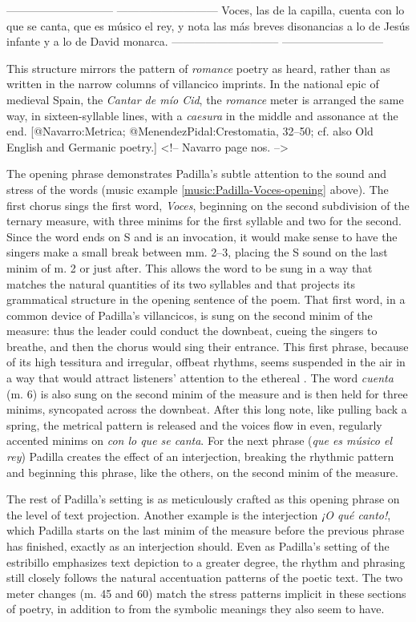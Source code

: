 -----------------------------   ---------------------------
Voces, las de la capilla,       cuenta con lo que se canta,
que es músico el rey, y nota    las más breves disonancias
a lo de Jesús infante           y a lo de David monarca.
-----------------------------   ---------------------------

\noindent
This structure mirrors the pattern of \emph{romance} poetry as heard, rather than as
written in the narrow columns of villancico imprints.
In the national epic of medieval Spain, the \emph{Cantar de mío Cid}, the \emph{romance}
meter is arranged the same way, in sixteen-syllable lines, with a \emph{caesura} in
the middle and assonance at the end.
[@Navarro:Metrica; @MenendezPidal:Crestomatia, 32--50; cf. also Old English
and Germanic poetry.]
<!-- Navarro page nos. -->

The opening phrase demonstrates Padilla's subtle attention to the sound and
stress of the words (music example \ref{music:Padilla-Voces-opening} above).
The first chorus sings the first word, \emph{Voces}, beginning on the second
subdivision of the ternary measure, with three minims for the first syllable and
two for the second.
Since the word ends on S and is an invocation, it would make sense to have the
singers make a small break between mm. 2--3, placing the S sound on the last
minim of m. 2 or just after.
This allows the word to be sung in a way that matches the natural quantities of
its two syllables and that projects its grammatical structure in the opening
sentence of the poem.
That first word, in a common device of Padilla's villancicos, is sung on the
second minim of the measure: thus the leader could conduct the downbeat, cueing
the singers to breathe, and then the chorus would sing their entrance. 
This first phrase, because of its high tessitura and irregular, offbeat rhythms,
seems suspended in the air in a way that would attract listeners' attention to
the ethereal . 
The word \emph{cuenta} (m. 6) is also sung on the second minim of the measure and is
then held for three minims, syncopated across the downbeat.
After this long note, like pulling back a spring, the metrical pattern is
released and the voices flow in even, regularly accented minims on \emph{con lo que
se canta}.
For the next phrase (\emph{que es músico el rey}) Padilla creates the effect of an
interjection, breaking the rhythmic pattern and beginning this phrase, like the
others, on the second minim of the measure.

The rest of Padilla's setting is as meticulously crafted as this opening phrase
on the level of text projection.
Another example is the interjection \emph{¡O qué canto!}, which Padilla starts on the
last minim of the measure before the previous phrase has finished, exactly as an
interjection should.
Even as Padilla's setting of the estribillo emphasizes text depiction to a
greater degree, the rhythm and phrasing still closely follows the natural
accentuation patterns of the poetic text.
The two meter changes (m. 45 and 60) match the stress patterns implicit in these
sections of poetry, in addition to from the symbolic meanings they also seem to
have.

